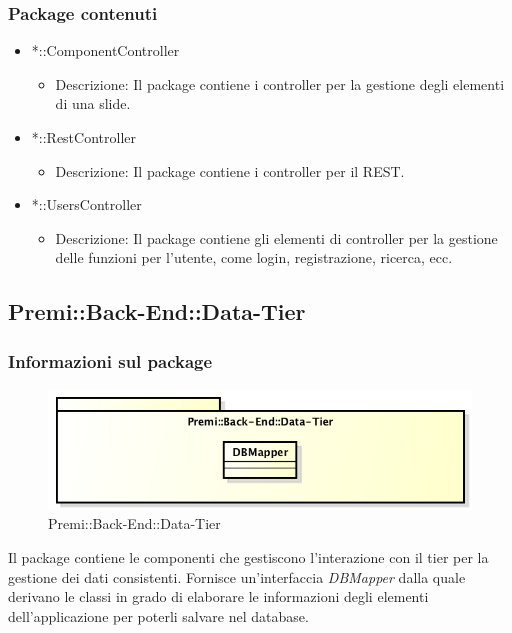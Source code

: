 \subsubsection{Package contenuti}
	\begin{itemize}
		\item *::ComponentController
		\begin{itemize}
			\item Descrizione: Il package contiene i controller per la gestione degli elementi di una slide.
		\end{itemize}
		
		\item *::RestController
		\begin{itemize}
			\item Descrizione: Il package contiene i controller per il REST.
		\end{itemize}
		
		\item *::UsersController
		\begin{itemize}
			\item Descrizione: Il package contiene gli elementi di controller per la gestione delle funzioni per l'utente, come login, registrazione, ricerca, ecc.
		\end{itemize}
	\end{itemize}



\subsection{Premi::Back-End::Data-Tier}
	\subsubsection{Informazioni sul package}
	\begin{figure}[h]
		\centering
		\includegraphics[width=0.5\linewidth]{img/back-end-package_data-tier}
		\caption[Premi::Back-End::Data-Tier]{Premi::Back-End::Data-Tier}
	\end{figure}
	Il package contiene le componenti che gestiscono l'interazione con il tier per la gestione dei dati consistenti. Fornisce un'interfaccia \textit{DBMapper} dalla quale derivano le classi in grado di elaborare le informazioni degli elementi dell'applicazione per poterli salvare nel database.